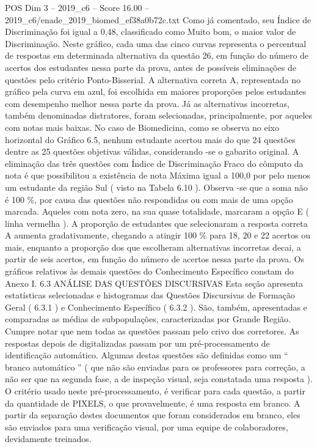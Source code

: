\begin{textsample}{POS Dim 3 – 2019\_c6 – Score 16.00 – 2019\_c6/enade\_2019\_biomed\_ef38a0b72c.txt}
Como já comentado, seu Índice de Discriminação foi igual a 0,48, classificado como Muito bom, o maior valor de Discriminação.
Neste gráfico, cada uma das cinco curvas representa o percentual de respostas em determinada alternativa da questão 26, em função do número de acertos dos estudantes nessa parte da prova, antes de possíveis eliminações de questões pelo critério Ponto-Bisserial.
A alternativa correta A, representada no gráfico pela curva em azul, foi escolhida em maiores proporções pelos estudantes com desempenho melhor nessa parte da prova.
Já as alternativas incorretas, também denominadas distratores, foram selecionadas, principalmente, por aqueles com notas mais baixas.
No caso de Biomedicina, como se observa no eixo horizontal do Gráfico 6.5, nenhum estudante acertou mais do que 24 questões dentre as 25 questões objetivas válidas, considerando -se o gabarito original.
A eliminação das três questões com Índice de Discriminação Fraco do cômputo da nota é que possibilitou a existência de nota Máxima igual a 100,0 por pelo menos um estudante da região Sul ( visto na Tabela 6.10 ).
Observa -se que a soma não é 100 \%, por causa das questões não respondidas ou com mais de uma opção marcada.
Aqueles com nota zero, na sua quase totalidade, marcaram a opção E ( linha vermelha ).
A proporção de estudantes que selecionaram a resposta correta A aumenta gradativamente, chegando a atingir 100 \% para 18, 20 e 22 acertos ou mais, enquanto a proporção dos que escolheram alternativas incorretas decai, a partir de seis acertos, em função do número de acertos nessa parte da prova.
Os gráficos relativos às demais questões do Conhecimento Específico constam do Anexo I. 6.3 ANÁLISE DAS QUESTÕES DISCURSIVAS Esta seção apresenta estatísticas selecionadas e histogramas das Questões Discursivas de Formação Geral ( 6.3.1 ) e Conhecimento Específico ( 6.3.2 ).
São, também, apresentadas e comparadas as médias de subpopulações, caracterizadas por Grande Região.
Cumpre notar que nem todas as questões passam pelo crivo dos corretores.
As respostas depois de digitalizadas passam por um pré-processamento de identificação automático.
Algumas destas questões são definidas como um “ branco automático ” ( que não são enviadas para os professores para correção, a não ser que na segunda fase, a de inspeção visual, seja constatada uma resposta ).
O critério usado neste pré-processamento, é verificar para cada questão, a partir da quantidade de PIXELS, o que provavelmente, é uma resposta em branco.
A partir da separação destes documentos que foram considerados em branco, eles são enviados para uma verificação visual, por uma equipe de colaboradores, devidamente treinados.

\end{textsample}
